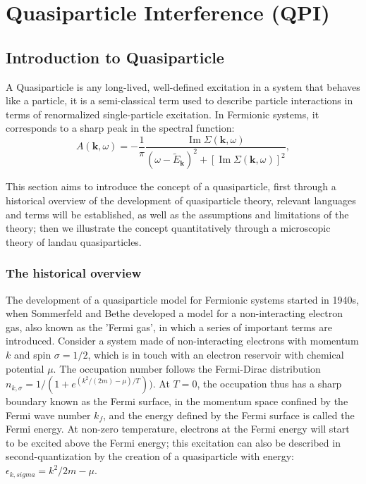 \chapter{Quasiparticle Interference (QPI)}
\section{Introduction to Quasiparticle}
A Quasiparticle is any long-lived, well-defined excitation in a system that behaves like a particle, it is a semi-classical term used to describe particle interactions in terms of renormalized single-particle excitation. In Fermionic systems, it corresponds to a sharp peak in the spectral function: 
	\[
	A(\mathbf{k}, \omega) = -\frac{1}{\pi} \frac{\operatorname{Im} \Sigma(\mathbf{k}, \omega)}{(\omega - \tilde{E}_{\mathbf{k}})^2 + [\operatorname{Im} \Sigma(\mathbf{k}, \omega)]^2},
	\]

This section aims to introduce the concept of a quasiparticle, first through a historical overview of the development of quasiparticle theory, relevant languages and terms will be established, as well as the assumptions and limitations of the theory; then we illustrate the concept quantitatively through a microscopic theory of landau quasiparticles. 

\subsection{The historical overview}
The development of a quasiparticle model for Fermionic systems started in 1940s, when Sommerfeld and Bethe\cite{SommerfeldBethe1933} developed a model for a non-interacting electron gas, also known as the 'Fermi gas', in which a series of important terms are introduced. Consider a system made of non-interacting electrons with momentum $k$ and spin $\sigma = 1/2$, which is in touch with an electron reservoir with chemical potential $\mu$. The occupation number follows the Fermi-Dirac distribution $n_{k,\sigma}=1/(1+e^{(k^2/(2m)-\mu)/T}))$. At $T=0$, the occupation thus has a sharp boundary known as the Fermi surface, in the momentum space confined by the Fermi wave number $k_f$, and the energy defined by the Fermi surface is called the Fermi energy. At non-zero temperature, electrons at the Fermi energy will start to be excited above the Fermi energy; this excitation can also be described in second-quantization by the creation of a quasiparticle with energy: $\epsilon_{k,sigma} = k^2/2m - \mu$. 

